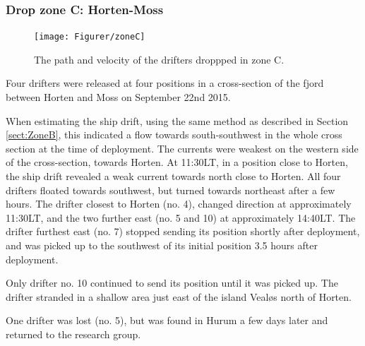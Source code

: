 \documentclass[12pt,a4paper,english]{article}
\begin{document}
\subsubsection{Drop zone C: Horten-Moss}
%
\begin{figure}[ht]
\centerline{
\texttt{[image: Figurer/zoneC]}}
\caption{\small
The path and velocity of the drifters droppped in zone C.}
\label{fig:ZoneC}
\end{figure}
%
%
Four drifters were released at four positions in a cross-section of the fjord between Horten and Moss on September 22nd 2015.%

When estimating the ship drift, using the same method as described in Section \ref{sect:ZoneB}, this indicated a flow towards south-southwest in the whole cross section at the time of deployment. The currents were weakest on the western side of the cross-section, towards Horten. At 11:30LT, in a position close to Horten, the ship drift revealed a weak current towards north close to Horten. All four drifters floated towards southwest, but turned towards northeast after a few hours. The drifter closest to Horten (no. 4), changed direction at approximately 11:30LT, and the two further east (no. 5 and 10) at approximately 14:40LT. The drifter furthest east (no. 7) stopped sending its position shortly after deployment, and was picked up to the southwest of its initial position 3.5 hours after deployment.

Only drifter no. 10 continued to send its position until it was picked up. The drifter stranded in a shallow area just east of the island Veal{\o}s north of Horten.

One drifter was lost (no. 5), but was found in Hurum a few days later and returned to the research group.

\end{document}
